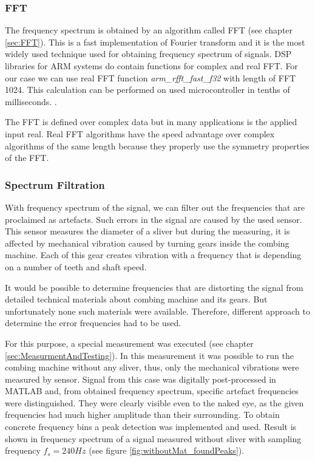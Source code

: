 \documentclass[twoside]{ctuthesis}
\theoremstyle{plain}
\theoremstyle{definition}
\theoremstyle{note}
\begin{document}
\subsubsection{FFT}
The frequency spectrum is obtained by an algorithm called FFT (see chapter \ref{sec:FFT}). This is a fast implementation of Fourier transform and it is the most widely used technique used for obtaining frequency spectrum of signals. DSP libraries for ARM systems do contain functions for complex and real FFT. For our case we can use real FFT function \textit{arm\_rfft\_fast\_f32} with length of FFT 1024. This calculation can be performed on used microcontroller in tenths of milliseconds. \cite{cite:STM32_DSP_library}.

The FFT is defined over complex data but in many applications is the applied input real. Real FFT algorithms have the speed advantage over complex algorithms of the same length because they properly use the symmetry properties of the FFT.

\subsubsection{Spectrum Filtration}
\label{sec:spectrumFiltration}
With frequency spectrum of the signal, we can filter out the frequencies that are proclaimed as artefacts. Such errors in the signal are caused by the used sensor. This sensor measures the diameter of a sliver but during the measuring, it is affected by mechanical vibration caused by turning gears inside the combing machine. Each of this gear creates vibration with a frequency that is depending on a number of teeth and shaft speed. 

It would be possible to determine frequencies that are distorting the signal from detailed technical materials about combing machine and its gears. But unfortunately none such materials were available. Therefore, different approach to determine the error frequencies had to be used. 

For this purpose, a special measurement was executed (see chapter \ref{sec:MeasurmentAndTesting}). In this measurement it was possible to run the combing machine without any sliver, thus, only the mechanical vibrations were measured by sensor. Signal from this case was digitally post-processed in MATLAB and, from obtained frequency spectrum, specific artefact frequencies were distinguished. They were clearly visible even to the naked eye, as the given frequencies had much higher amplitude than their surrounding. To obtain concrete frequency bins a peak detection was implemented and used. Result is shown in frequency spectrum of a signal measured without sliver with sampling frequency $f_s=240Hz$ (see figure \ref{fig:withoutMat_foundPeaks}).
\end{document}
